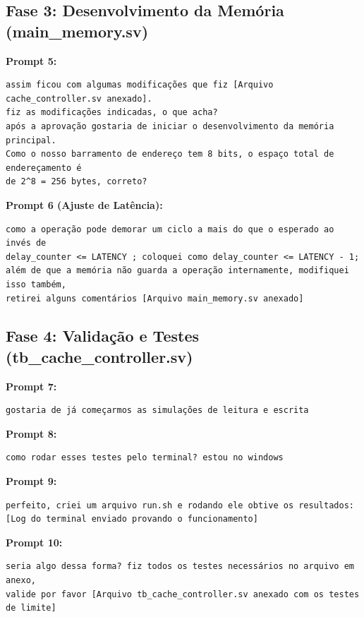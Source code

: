 ﻿\documentclass[12pt,a4paper]{article}
\begin{document}
\subsection{Fase 3: Desenvolvimento da Memória (main\_memory.sv)}
\textbf{Prompt 5:}
\begin{verbatim}
assim ficou com algumas modificações que fiz [Arquivo cache_controller.sv anexado].
fiz as modificações indicadas, o que acha? 
após a aprovação gostaria de iniciar o desenvolvimento da memória principal.
Como o nosso barramento de endereço tem 8 bits, o espaço total de endereçamento é 
de 2^8 = 256 bytes, correto?
\end{verbatim}

\textbf{Prompt 6 (Ajuste de Latência):}
\begin{verbatim}
como a operação pode demorar um ciclo a mais do que o esperado ao invés de 
delay_counter <= LATENCY ; coloquei como delay_counter <= LATENCY - 1;
além de que a memória não guarda a operação internamente, modifiquei isso também, 
retirei alguns comentários [Arquivo main_memory.sv anexado]
\end{verbatim}

\subsection{Fase 4: Validação e Testes (tb\_cache\_controller.sv)}
\textbf{Prompt 7:}
\begin{verbatim}
gostaria de já começarmos as simulações de leitura e escrita
\end{verbatim}

\textbf{Prompt 8:}
\begin{verbatim}
como rodar esses testes pelo terminal? estou no windows
\end{verbatim}

\textbf{Prompt 9:}
\begin{verbatim}
perfeito, criei um arquivo run.sh e rodando ele obtive os resultados:
[Log do terminal enviado provando o funcionamento]
\end{verbatim}

\textbf{Prompt 10:}
\begin{verbatim}
seria algo dessa forma? fiz todos os testes necessários no arquivo em anexo, 
valide por favor [Arquivo tb_cache_controller.sv anexado com os testes de limite]
\end{verbatim}
\end{document}
